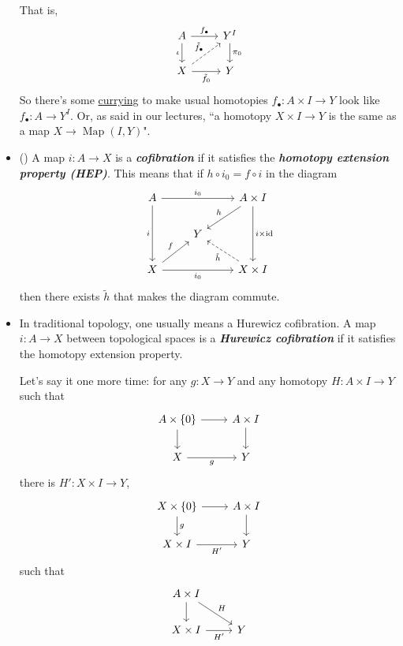 \documentclass{article}
\DeclareMathOperator{\id}{id}
\DeclareMathOperator{\Map}{Map}
\begin{document}
\begin{defn}
\begin{itemize}
		That is,
		\[\begin{tikzcd}
			A\arrow[r,"f_\bullet"]\arrow[d,swap,"\iota"]&Y^I\arrow[d,"\pi_0"]\\
			X\arrow[ur,dashed,"\tilde{f}_\bullet"]\arrow[r,swap,"\tilde{f}_0"]&Y
		\end{tikzcd}\]
		{\color{persiangreen}So there's some \href{https://en.wikipedia.org/wiki/Currying#Function_spaces}{currying} to make usual homotopies $f_\bullet:A\times I\to Y$ look like $f_\bullet:A\to Y^I$. Or, as said in our lectures, ``a homotopy $X\times I\to Y$ is the same as a map $X\to \Map(I,Y)$".}
		
		\item (\cite{may}) A map $i:A\to X$ is a \textbf{\textit{cofibration}} if it satisfies the \textbf{\textit{homotopy extension property (HEP)}}. This means that if $h\circ i_0=f\circ i$ in the diagram
		\[\begin{tikzcd}
			A\arrow[rr,"i_0"]\arrow[dd,"i",swap]&&A\times I\arrow[dd,"i\times\id"]\arrow[dl,"h",swap]\\
			&Y\\
			X\arrow[ur,"f"]\arrow[rr,"i_0",swap]&&X\times I\arrow[ul,dashed,"\tilde{h}"]
		\end{tikzcd}\]
		then there exists $\tilde{h}$ that makes the diagram commute.
		
	\item In traditional topology, one usually means a Hurewicz cofibration. A map  $i:A\to X$ between topological spaces is a \textbf{\textit{Hurewicz cofibration}} if it satisfies the homotopy extension property.
	
	Let's say it one more time: for any $g:X\to Y$ and any homotopy $H:A\times I\to Y$ such that \[\begin{tikzcd}
		A\times\{0\}\arrow[r]\arrow[d]&A\times I\arrow[d]\\
		X\arrow[r,"g",swap]&Y
	\end{tikzcd}\]
	there is $H':X\times I\to Y$,
	\[\begin{tikzcd}
		X\times\{0\}\arrow[r]\arrow[d,"g"]&A\times I\arrow[d]\\
		X\times I\arrow[r,"H'",swap]&Y
	\end{tikzcd}\]
	such that
	\[\begin{tikzcd}
		A\times I\arrow[dr,"H"]\arrow[d]\\
		X\times I\arrow[r,"H'",swap]&Y
	\end{tikzcd}\]
\end{itemize}
\end{defn}
\end{document}
